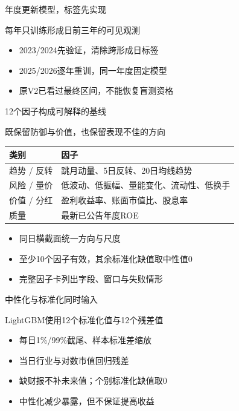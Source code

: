 \documentclass[aspectratio=169,10pt]{beamer}
\begin{document}
\begin{frame}{年度更新模型，标签先实现}
\begin{block}{}每年只训练形成日前三年的可见观测\end{block}
\small\begin{itemize}
\item 2023/2024先验证，清除跨形成日标签
\item 2025/2026逐年重训，同一年度固定模型
\item 原V2已看过最终区间，不能恢复盲测资格
\end{itemize}
\end{frame}

\begin{frame}{12个因子构成可解释的基线}
\begin{block}{}既保留防御与价值，也保留表现不佳的方向\end{block}
\begin{center}\small\begin{tabularx}{.96\textwidth}{lX}\toprule
类别 & 因子\\\midrule
趋势 / 反转 & 跳月动量、5日反转、20日均线趋势\\
风险 / 量价 & 低波动、低振幅、量能变化、流动性、低换手\\
价值 / 分红 & 盈利收益率、账面市值比、股息率\\
质量 & 最新已公告年度ROE\\
\bottomrule\end{tabularx}\end{center}
\small\begin{itemize}
\item 同日横截面统一方向与尺度
\item 至少10个因子有效，其余标准化缺值取中性值0
\item 完整因子卡列出字段、窗口与失败情形
\end{itemize}
\end{frame}

\begin{frame}{中性化与标准化同时输入}
\begin{block}{}LightGBM使用12个标准化值与12个残差值\end{block}
\small\begin{itemize}
\item 每日1\%/99\%截尾、样本标准差缩放
\item 当日行业与对数市值回归残差
\item 缺财报不补未来值；个别标准化缺值取0
\item 中性化减少暴露，但不保证提高收益
\end{itemize}
\end{frame}
\end{document}
